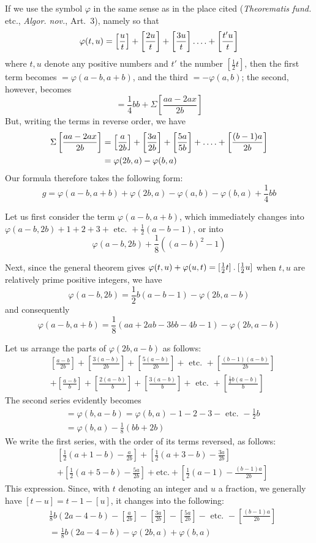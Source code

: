 If we use the symbol $\varphi$ in the same sense as in the place cited (\emph{Theorematis fund.} etc., \emph{Algor. nov.}, Art.~3), namely so that
\[
\varphi(t,u)=\left[\frac{u}{t}\right]+\left[\frac{2u}{t}\right]+\left[\frac{3u}{t}\right]\mathinner{.\,.\,.\,.}+\left[\frac{t'u}{t}\right]
\]
where $t,u$ denote any positive numbers and $t'$ the number $[\frac12t]$, then the first term becomes $=\varphi(a-b,a+b)$, and the third $=-\varphi(a,b)$; the second, however, becomes
%
\[
=\frac14bb+\Sigma\left[\frac{aa-2ax}{2b}\right]
\]
But, writing the terms in reverse order, we have
\[
\begin{aligned}
\Sigma\left[\frac{aa-2ax}{2b}\right]&=\left[\frac{a}{2b}\right]+\left[\frac{3a}{2b}\right]+\left[\frac{5a}{5b}\right]+\mathinner{.\,.\,.\,.}+\left[\frac{(b-1)a}{2b}\right]\\
&=\varphi(2b,a)-\varphi(b,a)
\end{aligned}
\]
Our formula therefore takes the following form:
\[
g=\varphi(a-b,a+b)+\varphi(2b,a)-\varphi(a,b)-\varphi(b,a)+\frac14bb
\]

Let us first consider the term $\varphi(a-b,a+b)$, which immediately changes into $\varphi(a-b,2b)+1+2+3+\text{ etc. }+\frac12(a-b-1)$, or into
\[
\varphi(a-b,2b)+\frac18((a-b)^2-1)
\]

Next, since the general theorem gives $\varphi(t,u)+\varphi(u,t)=[\frac12t]\mathbin{.}[\frac12u]$ when $t,u$ are relatively prime positive integers, we have
\[
\varphi(a-b,2b)=\frac12b(a-b-1)-\varphi(2b,a-b)
\]
and consequently
\[
\varphi(a-b,a+b)=\frac18(aa+2ab-3bb-4b-1)-\varphi(2b,a-b)
\]

Let us arrange the parts of $\varphi(2b,a-b)$ as follows:
\[
\begin{aligned}
&\left[\frac{a-b}{2b}\right]+\left[\frac{3(a-b)}{2b}\right]+\left[\frac{5(a-b)}{2b}\right]+\text{ etc. }+\left[\frac{(b-1)(a-b)}{2b}\right]\\
&+\left[\frac{a-b}{b}\right]+\left[\frac{2(a-b)}{b}\right]+\left[\frac{3(a-b)}{b}\right]+\text{ etc. }+\left[\frac{\frac12b(a-b)}{b}\right]
\end{aligned}
\]
The second series evidently becomes
\[
\begin{aligned}
&=\varphi(b,a-b)=\varphi(b,a)-1-2-3-\text{ etc. }-\frac12b\\
&=\varphi(b,a)-\frac18(bb+2b)
\end{aligned}
\]
We write the first series, with the order of its terms reversed, as follows:
\[
\begin{aligned}
&\left[\frac12(a+1-b)-\frac{a}{2b}\right]+\left[\frac12(a+3-b)-\frac{3a}{2b}\right]\\
&+\left[\frac12(a+5-b)-\frac{5a}{2b}\right]+\text{etc.}+\left[\frac12(a-1)-\frac{(b-1)a}{2b}\right]
\end{aligned}
\]
This expression. Since, with $t$ denoting an integer and $u$ a fraction, we generally have $[t-u]=t-1-[u]$, it changes into the following:
\[
\begin{aligned}
&\frac18b(2a-4-b)-\left[\frac{a}{2b}\right]-\left[\frac{3a}{2b}\right]-\left[\frac{5a}{2b}\right]-\text{ etc. }-\left[\frac{(b-1)a}{2b}\right]\\
&=\frac18b(2a-4-b)-\varphi(2b,a)+\varphi(b,a)
\end{aligned}
\]

